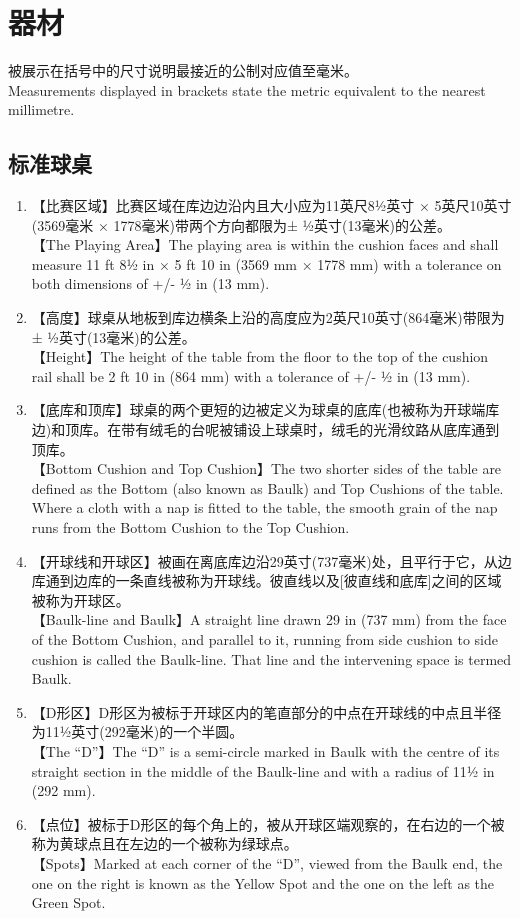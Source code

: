 \section{器材}\label{221}

\noindent 被展示在括号中的尺寸说明最接近的公制对应值至毫米。\\
Measurements displayed in brackets state the metric equivalent to the nearest millimetre.

\subsection{标准球桌}\label{2211}

\begin{enumerate}[label=(\alph*)]
    \item 【比赛区域】比赛区域在库边边沿内且大小应为11英尺8½英寸 × 5英尺10英寸(3569毫米 × 1778毫米)带两个方向都限为± ½英寸(13毫米)的公差。\\
    【The Playing Area】The playing area is within the cushion faces and shall measure 11 ft 8½ in × 5 ft 10 in (3569 mm × 1778 mm) with a tolerance on both dimensions of +/- ½ in (13 mm).
    \item 【高度】球桌从地板到库边横条上沿的高度应为2英尺10英寸(864毫米)带限为± ½英寸(13毫米)的公差。\\
    【Height】The height of the table from the floor to the top of the cushion rail shall be 2 ft 10 in (864 mm) with a tolerance of +/- ½ in (13 mm).
    \item 【底库和顶库】球桌的两个更短的边被定义为球桌的底库(也被称为开球端库边)和顶库。在带有绒毛的台呢被铺设上球桌时，绒毛的光滑纹路从底库通到顶库。\\
    【Bottom Cushion and Top Cushion】The two shorter sides of the table are defined as the Bottom (also known as Baulk) and Top Cushions of the table. Where a cloth with a nap is fitted to the table, the smooth grain of the nap runs from the Bottom Cushion to the Top Cushion.
    \item 【开球线和开球区】被画在离底库边沿29英寸(737毫米)处，且平行于它，从边库通到边库的一条直线被称为开球线。彼直线以及[彼直线和底库]之间的区域被称为开球区。\\
    【Baulk-line and Baulk】A straight line drawn 29 in (737 mm) from the face of the Bottom Cushion, and parallel to it, running from side cushion to side cushion is called the Baulk-line. That line and the intervening space is termed Baulk.
    \item 【D形区】D形区为被标于开球区内的笔直部分的中点在开球线的中点且半径为11½英寸(292毫米)的一个半圆。\\
    【The ``D''】The ``D'' is a semi-circle marked in Baulk with the centre of its straight section in the middle of the Baulk-line and with a 
    radius of 11½ in (292 mm).
    \item \label{2211f}【点位】被标于D形区的每个角上的，被从开球区端观察的，在右边的一个被称为黄球点且在左边的一个被称为绿球点。\\
    【Spots】Marked at each corner of the ``D'', viewed from the Baulk end, the one on the right is known as the Yellow Spot and the one on the left as the Green Spot.


\end{enumerate}
